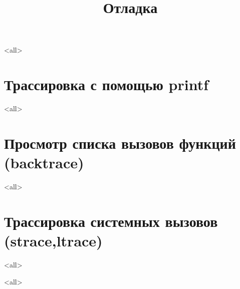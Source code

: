 
\title[Отладка]{Отладка}





\begin{frame}
	\frametitle{}
	\titlepage
	\vspace{-0.5cm}
	\begin{center}
	\end{center}
\end{frame}

\begin{frame}
	\tableofcontents
\end{frame}



\mode<all>{}

\section[printf]{Трассировка с помощью printf}

\mode<all>{}

\section[backtrace]{Просмотр списка вызовов функций (backtrace)}
\mode<all>{}

\section[strace]{Трассировка системных вызовов (strace,ltrace)}
\mode<all>{}

\mode<all>


